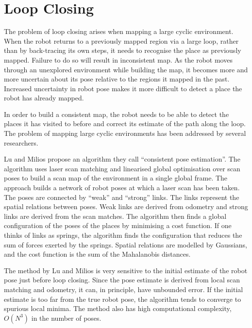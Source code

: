\section{Loop Closing}
\label{sec:back_loop}

The problem of loop closing arises when mapping a large cyclic
environment. When the robot returns to a previously mapped region via
a large loop, rather than by back-tracing its own steps, it needs to
recognise the place as previously mapped. Failure to do so will result
in inconsistent map.  As the robot moves through an unexplored
environment while building the map, it becomes more and more uncertain
about its pose relative to the regions it mapped in the past.
Increased uncertainty in robot pose makes it more difficult to
detect a place the robot has already mapped.


In order to build a consistent map, the robot needs to be able to
detect the places it has visited to before and correct its estimate of
the path along the loop. The problem of mapping large cyclic
environments has been addressed by several researchers.




Lu and Milios \cite{lu97:_global} propose an algorithm they call
``consistent pose estimation''. The algorithm uses laser scan matching
and linearised global optimisation over scan poses to build a scan map
of the environment in a single global frame. The approach builds a
network of robot poses at which a laser scan has been taken. The poses
are connected by ``weak'' and ``strong'' links. The links represent
the spatial relations between poses. Weak links are derived from
odometry and strong links are derived from the scan matches. The
algorithm then finds a global configuration of the poses of the places
by minimising a cost function. If one thinks of links as springs, the
algorithm finds the configuration that reduces the sum of forces
exerted by the springs. Spatial relations are modelled by Gaussians,
and the cost function is the sum of the Mahalanobis distances.

The method by Lu and Milios is very sensitive to the initial estimate
of the robot pose just before loop closing. Since the pose estimate is
derived from local scan matching and odometry, it can, in principle,
have unbounded error. If the initial estimate is too far from the true
robot pose, the algorithm tends to converge to spurious local minima.
The method also has high computational complexity, $O(N^3)$ in the number of poses.

